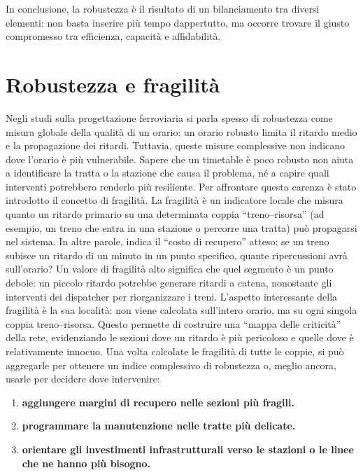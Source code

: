 \documentclass[a4paper,12pt]{report}
\begin{document}
    In conclusione, la robustezza è il risultato di un bilanciamento tra diversi elementi: non basta inserire più tempo dappertutto, ma occorre trovare il giusto compromesso tra efficienza, capacità e affidabilità.

\section{Robustezza e fragilità}
Negli studi sulla progettazione ferroviaria si parla spesso di robustezza come misura globale della qualità di un orario: un orario robusto limita il ritardo medio e la propagazione dei ritardi. Tuttavia, queste misure complessive non indicano dove l’orario è più vulnerabile. Sapere che un timetable è poco robusto non aiuta a identificare la tratta o la stazione che causa il problema, né a capire quali interventi potrebbero renderlo più resiliente.
Per affrontare questa carenza è stato introdotto il concetto di fragilità. La fragilità è un indicatore locale che misura quanto un ritardo primario su una determinata coppia “treno–risorsa” (ad esempio, un treno che entra in una stazione o percorre una tratta) può propagarsi nel sistema. In altre parole, indica il “costo di recupero” atteso: se un treno subisce un ritardo di un minuto in un punto specifico, quante ripercussioni avrà sull’orario? Un valore di fragilità alto significa che quel segmento è un punto debole: un piccolo ritardo potrebbe generare ritardi a catena, nonostante gli interventi dei dispatcher per riorganizzare i treni.
L’aspetto interessante della fragilità è la sua località: non viene calcolata sull’intero orario, ma su ogni singola coppia treno–risorsa. Questo permette di costruire una “mappa delle criticità” della rete, evidenziando le sezioni dove un ritardo è più pericoloso e quelle dove è relativamente innocuo. Una volta calcolate le fragilità di tutte le coppie, si può aggregarle per ottenere un indice complessivo di robustezza o, meglio ancora, usarle per decidere dove intervenire:
\begin{enumerate}
    \item \textbf{aggiungere margini di recupero nelle sezioni più fragili.}

    \item \textbf{programmare la manutenzione nelle tratte più delicate.}

    \item \textbf{orientare gli investimenti infrastrutturali verso le stazioni o le linee che ne hanno più bisogno.}
    
    \end{enumerate}
    
\end{document}
